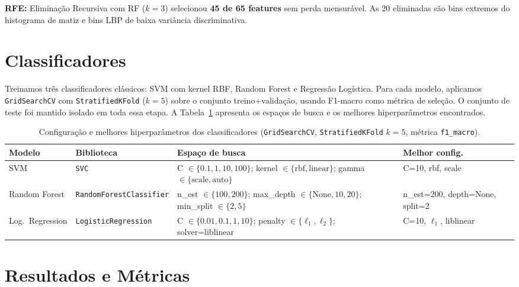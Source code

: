 \documentclass[12pt,a4paper]{article}
\begin{document}
\textbf{RFE:} Eliminação Recursiva com RF ($k{=}3$) selecionou \textbf{45 de 65 features}
sem perda mensurável. As 20 eliminadas são bins extremos do histograma de matiz e bins
LBP de baixa variância discriminativa.

\section{Classificadores}

Treinamos três classificadores clássicos: SVM com kernel RBF, Random Forest e
Regressão Logística. Para cada modelo, aplicamos \texttt{GridSearchCV} com
\texttt{StratifiedKFold} ($k{=}5$) sobre o conjunto treino+validação, usando
F1-macro como métrica de seleção. O conjunto de teste foi mantido isolado em
toda essa etapa. A Tabela~\ref{tab:classif} apresenta os espaços de busca e
os melhores hiperparâmetros encontrados.

\begin{table}[!htbp]
\centering
\caption{Configuração e melhores hiperparâmetros dos classificadores (\texttt{GridSearchCV},
         \texttt{StratifiedKFold} $k{=}5$, métrica \texttt{f1\_macro}).}
\label{tab:classif}
\small
\begin{tabular}{p{2.2cm} p{2.8cm} p{5.0cm} p{2.8cm}}
\toprule
\textbf{Modelo} & \textbf{Biblioteca} & \textbf{Espaço de busca} & \textbf{Melhor config.} \\
\midrule
SVM &
\texttt{SVC} &
C $\in\{0.1,1,10,100\}$; kernel $\in\{\mathrm{rbf,linear}\}$; gamma $\in\{\mathrm{scale,auto}\}$ &
C=10, rbf, scale \\
Random Forest &
\texttt{RandomForest\-Classifier} &
n\_est $\in\{100,200\}$; max\_depth $\in\{\mathrm{None},10,20\}$; min\_split $\in\{2,5\}$ &
n\_est=200, depth=None, split=2 \\
Log.\ Regression &
\texttt{Logistic\-Regression} &
C $\in\{0.01,0.1,1,10\}$; penalty $\in\{\ell_1,\ell_2\}$; solver=liblinear &
C=10, $\ell_1$, liblinear \\
\bottomrule
\end{tabular}
\end{table}

\section{Resultados e Métricas}
\end{document}
